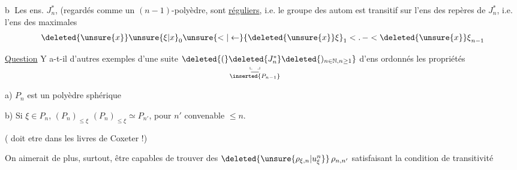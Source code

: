 \textcircled{b} Les ens.  $J_n^*$, (regardés comme un $(n-1)$-polyèdre, sont \uline{réguliers}, i.e. le groupe des autom est transitif sur l'ens des repères de $J_n^*$, i.e. l'ens des  maximales
\[
{\deleted{\unsure{x}}\unsure{\xi|x}}_0\unsure{<|\leftarrow}{\deleted{\unsure{x}}\xi}_1<.\,-<{\deleted{\unsure{x}}\xi}_{n-1}
\]

\uline{Question} Y a-t-il d'autres exemples d'une suite  $ \deleted{(}\underset{\substack{\llcorner\mkern-5mu\underline{\phantom{J_n^*}}\mkern-5mu\lrcorner\\\inserted{P_{n-1}}}}{\deleted{J_n^*}}\deleted{)_{n\in\mathbb N,n\geq1}}$  d'ens ordonnés  les propriétés

a) $P_n$ est un polyèdre \uline{} sphérique

b) Si $\xi\in P_n$,   $(P_n)_{\leq\xi}$  $(P_n)_{\leq\xi}\simeq P_{n'}$, pour $n'$ convenable $\leq n$.

( doit etre dans les livres de Coxeter !)

On aimerait de plus, surtout, être capables de trouver des $\deleted{\unsure{\rho_{\xi,n}|u^n_\xi}}\,\rho_{n,n'}$ satisfaisant la condition de transitivité

